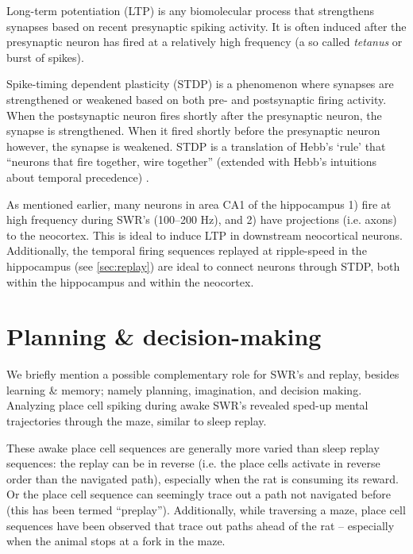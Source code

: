 
Long-term potentiation (LTP) is any biomolecular process that strengthens  synapses based on recent presynaptic spiking activity. It is often induced after the presynaptic neuron has fired at a relatively high frequency (a so called \emph{tetanus} or burst of spikes).

Spike-timing dependent plasticity (STDP) is a phenomenon where synapses are strengthened or weakened based on both pre- and postsynaptic firing activity. When the postsynaptic neuron fires shortly after the presynaptic neuron, the synapse is strengthened. When it fired shortly before the presynaptic neuron however, the synapse is weakened. STDP is a translation of Hebb's `rule' that ``neurons that fire together, wire together'' (extended with Hebb's intuitions about temporal precedence) \cite{Caporale2008}.

As mentioned earlier, many neurons in area CA1 of the hippocampus 1) fire at high frequency during SWR's (100--200 Hz), and 2) have projections (i.e. axons) to the neocortex. This is ideal to induce LTP in downstream neocortical neurons. Additionally, the temporal firing sequences replayed at ripple-speed in the hippocampus (see \cref{sec:replay}) are ideal to connect neurons through STDP, both within the hippocampus and within the neocortex.




\section{Planning \& decision-making}
\label{sec:planning}

We briefly mention a possible complementary role for SWR's and replay, besides learning \& memory; namely planning, imagination, and decision making. Analyzing place cell spiking during awake SWR's revealed sped-up mental trajectories through the maze, similar to sleep replay.

These awake place cell sequences are generally more varied than sleep replay sequences: the replay can be in reverse (i.e. the place cells activate in reverse order than the navigated path), especially when the rat is consuming its reward. Or the place cell sequence can seemingly trace out a path not navigated before (this has been termed ``preplay''). Additionally, while traversing a maze, place cell sequences have been observed that trace out paths ahead of the rat -- especially when the animal stops at a fork in the maze.

